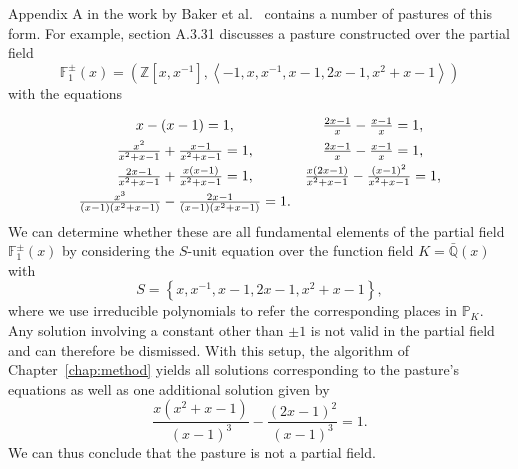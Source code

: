Appendix A in the work by Baker et al.~\cite{baker-2024-foundations-of-matroids} contains a number of pastures of this form. For example, section A.3.31 discusses a pasture constructed over the partial field
\[\mathbb{F}_{1}^{\pm}(x) = \left( \mathbb{Z} \left[ x, x^{-1} \right], \left\langle -1, x, x^{-1}, x -1, 2x - 1, x^{2} + x - 1 \right\rangle \right)\]
with the equations
\begin{equation*}
  \def\arraystretch{1.5}
  \begin{array}{cc}
    x - (x - 1) = 1,                                                                  & \frac{2x - 1}{x} - \frac{x - 1}{x} = 1,                                    \\
    \frac{x^{2}}{x^{2} + x - 1} + \frac{x - 1}{x^{2} + x - 1} = 1,                    & \frac{2x - 1}{x} - \frac{x - 1}{x} = 1,                                    \\
    \frac{2x - 1}{x^{2} + x - 1} + \frac{x(x - 1)}{x^{2} + x - 1} = 1,                & \frac{x(2x - 1)}{x^{2} + x - 1} - \frac{{(x - 1)}^{2}}{x^{2} + x - 1} = 1, \\
    \frac{x^{3}}{(x - 1)(x^{2} + x - 1)} - \frac{2x - 1}{(x - 1)(x^{2} + x - 1)} = 1. &
  \end{array}
\end{equation*}
We can determine whether these are all fundamental elements of the partial field \(\mathbb{F}_{1}^{\pm}(x)\) by considering the \(S\)-unit equation over the function field \(K = \bar{\mathbb{Q}}(x)\) with
\[S = \left\{ x, x^{-1}, x -1, 2x - 1, x^{2} + x - 1 \right\},\]
where we use irreducible polynomials to refer the corresponding places in \(\mathbb{P}_{K}\). Any solution involving a constant other than \(\pm 1\) is not valid in the partial field and can therefore be dismissed. With this setup, the algorithm of Chapter~\ref{chap:method} yields all solutions corresponding to the pasture's equations as well as one additional solution given by
\[\frac{x(x^{2} + x - 1)}{{(x - 1)}^{3}} - \frac{{(2x - 1)}^{2}}{{(x - 1)}^{3}} = 1.\]
We can thus conclude that the pasture is not a partial field.
